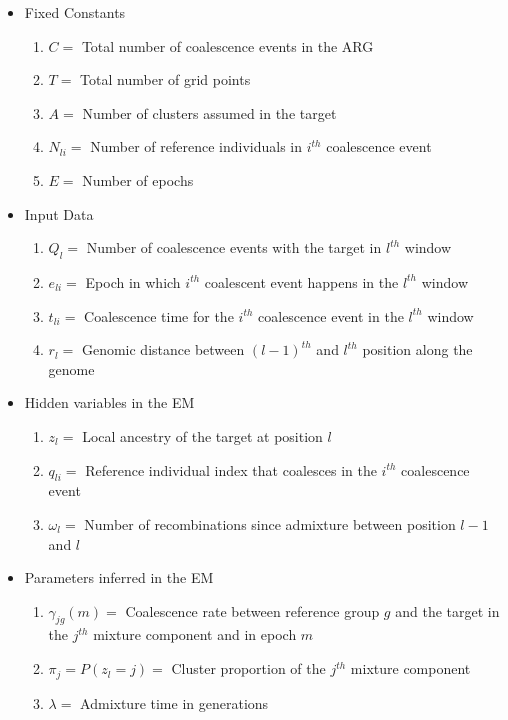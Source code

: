 \begin{itemize}
    \item Fixed Constants
    \begin{enumerate}
        \item $C =$ Total number of coalescence events in the ARG
        \item $T =$ Total number of grid points
        \item $A =$ Number of clusters assumed in the target
        \item $N_{li} =$ Number of reference individuals in $i^{th}$ coalescence event
        \item $E =$ Number of epochs
    \end{enumerate}
    \item Input Data
    \begin{enumerate}
        \item $Q_l =$ Number of coalescence events with the target in $l^{th}$ window
        \item $e_{li} =$ Epoch in which $i^{th}$ coalescent event happens in the $l^{th}$ window
        \item $t_{li} =$ Coalescence time for the $i^{th}$ coalescence event in the $l^{th}$ window
        \item $r_{l} =$ Genomic distance between $(l-1)^{th}$ and $l^{th}$ position along the genome
    \end{enumerate}
    \item Hidden variables in the EM
    \begin{enumerate}
        \item $z_l =$ Local ancestry of the target at position $l$
        \item $q_{li} =$ Reference individual index that coalesces in the $i^{th}$ coalescence event
        \item $\omega_l =$ Number of recombinations since admixture between position $l-1$ and $l$
    \end{enumerate}
    \item Parameters inferred in the EM
    \begin{enumerate}
        \item $\gamma_{jg}(m) =$ Coalescence rate between reference group $g$ and the target in the $j^{th}$ mixture component and in epoch $m$
        \item $\pi_j  = P(z_l = j) =$ Cluster proportion of the $j^{th}$ mixture component
        \item $\lambda =$ Admixture time in generations 
    \end{enumerate}
\end{itemize}

